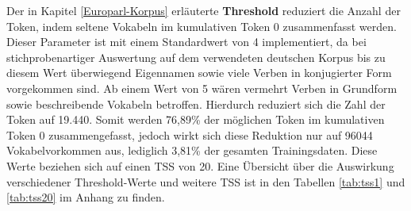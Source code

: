 \documentclass[conference]{IEEEtran}
\begin{document}
Der in Kapitel \ref{Europarl-Korpus} erläuterte \textbf{Threshold} reduziert die Anzahl der Token, indem seltene Vokabeln im kumulativen Token 0 zusammenfasst werden.
Dieser Parameter ist mit einem Standardwert von 4 implementiert, da bei stichprobenartiger Auswertung auf dem verwendeten deutschen Korpus bis zu diesem Wert überwiegend Eigennamen sowie viele Verben in konjugierter Form vorgekommen sind. 
Ab einem Wert von 5 wären vermehrt Verben in Grundform sowie beschreibende Vokabeln betroffen.
Hierdurch reduziert sich die Zahl der Token auf 19.440.
Somit werden 76,89\% der möglichen Token im kumulativen Token 0 zusammengefasst, jedoch wirkt sich diese Reduktion nur auf 96044 Vokabelvorkommen aus, lediglich 3,81\% der gesamten Trainingsdaten. 
Diese Werte beziehen sich auf einen TSS von 20.
Eine Übersicht über die Auswirkung verschiedener Threshold-Werte und weitere TSS ist in den Tabellen \ref{tab:tss1} und \ref{tab:tss20} im Anhang zu finden.
\end{document}
